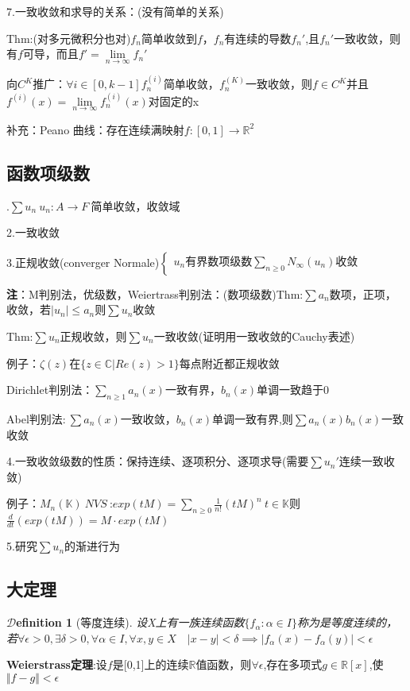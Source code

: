 \documentclass[hyperfer,UTF8,a4paper,12pt]{article}
\theoremstyle{plain}
\newtheorem{Def}{{$\mathcal{D}$efinition}}[section]
\begin{document}
7.一致收敛和求导的关系：(没有简单的关系)

Thm:(对多元微积分也对)$ f_n $简单收敛到$ f $，$ f_n$有连续的导数$ f_n' $,且$ f_n' $一致收敛，则有$ f $可导，而且$f'=\lim\limits_{n\to\infty}f_n'  $

向$ C^K $推广：$ \forall i\in[0,k-1] f_n^{(i)} $简单收敛，$   f_n^{(K)}$一致收敛，则$ f\in C^K $并且$ f^{(i)}(x)=\lim\limits_{n\to\infty}f_n^{(i)}(x) $对固定的x

补充：Peano 曲线：存在连续满映射$ f:[0,1]\to\mathbb{R}^2 $
\subsection{函数项级数}.$ \sum u_n\ u_n:A\to F\ $简单收敛，收敛域

2.一致收敛

3.正规收敛(converger Normale)$ \begin{cases}
u_n \textrm{有界}

\textrm{数项级数}\sum\limits_{n\ge 0}N_\infty(u_n)\textrm{收敛}
\end{cases} $

\textbf{注}：M判别法，优级数，Weiertrass判别法：(数项级数)Thm:$ \sum a_n $数项，正项，收敛，若$|u_n|\le a_n$则$ \sum u_n $收敛

Thm:$ \sum u_n $正规收敛，则$ \sum u_n $一致收敛(证明用一致收敛的Cauchy表述)

例子：$ \zeta(z) $在$ \{z\in \mathbb{C}| Re(z)>1 \} $每点附近都正规收敛

Dirichlet判别法：$ \sum\limits_{n\ge 1} a_n(x) $一致有界，$ b_n(x) $单调一致趋于0

Abel判别法:$\ \sum a_n(x) $一致收敛，$ b_n(x) $单调一致有界,则$ \sum a_n(x)b_n(x)$一致收敛

4.一致收敛级数的性质：保持连续、逐项积分、逐项求导(需要$ \sum u_n' $连续一致收敛)

例子：$ M_n(\mathbb{K})\ NVS\ $:$ exp(tM)=\sum\limits_{n\ge 0}\frac{1}{n!}(tM)^n \ t\in \mathbb{K}$则$ \frac{d}{dt}(exp(tM))=M\cdot exp(tM) $

5.研究$ \sum u_n $的渐进行为
\subsection{大定理}
\begin{Def}[等度连续]
	设X上有一族连续函数$ \{f_\alpha:\alpha\in I \} $称为是等度连续的，若$ \forall\epsilon>0,\exists\delta>0,\forall\alpha\in I,\forall x,y\in X\quad |x-y|<\delta\implies|f_\alpha(x)-f_\alpha(y)|<\epsilon $
\end{Def}\noindent
\textbf{Weierstrass定理}:设$ f $是[0,1]上的连续$ \mathbb{R} $值函数，则$ \forall \epsilon $,存在多项式$ g\in\mathbb{R}[x] $,使$ \Vert f-g \Vert<\epsilon $
\end{document}
